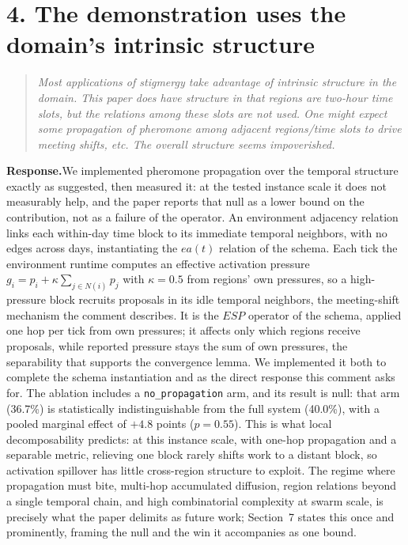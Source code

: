 \documentclass[11pt]{article}
\newcommand{\quoted}[1]{\begin{quote}\itshape #1\end{quote}}
\newcommand{\response}{\par\smallskip\noindent\textbf{Response.}\space}
\begin{document}
\section*{4. The demonstration uses the domain's intrinsic structure}

\quoted{Most applications of stigmergy take advantage of intrinsic structure in the domain. This paper does have structure in that regions are two-hour time slots, but the relations among these slots are not used. One might expect some propagation of pheromone among adjacent regions/time slots to drive meeting shifts, etc. The overall structure seems impoverished.}

\response We implemented pheromone propagation over the temporal structure exactly as suggested, then measured it: at the tested instance scale it does not measurably help, and the paper reports that null as a lower bound on the contribution, not as a failure of the operator. An environment adjacency relation links each within-day time block to its immediate temporal neighbors, with no edges across days, instantiating the $ea(t)$ relation of the schema. Each tick the environment runtime computes an effective activation pressure $g_i = p_i + \kappa \sum_{j \in N(i)} p_j$ with $\kappa = 0.5$ from regions' own pressures, so a high-pressure block recruits proposals in its idle temporal neighbors, the meeting-shift mechanism the comment describes. It is the $ESP$ operator of the schema, applied one hop per tick from own pressures; it affects only which regions receive proposals, while reported pressure stays the sum of own pressures, the separability that supports the convergence lemma. We implemented it both to complete the schema instantiation and as the direct response this comment asks for. The ablation includes a \texttt{no\_propagation} arm, and its result is null: that arm (36.7\%) is statistically indistinguishable from the full system (40.0\%), with a pooled marginal effect of $+4.8$ points ($p = 0.55$). This is what local decomposability predicts: at this instance scale, with one-hop propagation and a separable metric, relieving one block rarely shifts work to a distant block, so activation spillover has little cross-region structure to exploit. The regime where propagation must bite, multi-hop accumulated diffusion, region relations beyond a single temporal chain, and high combinatorial complexity at swarm scale, is precisely what the paper delimits as future work; Section~7 states this once and prominently, framing the null and the win it accompanies as one bound.
\end{document}
